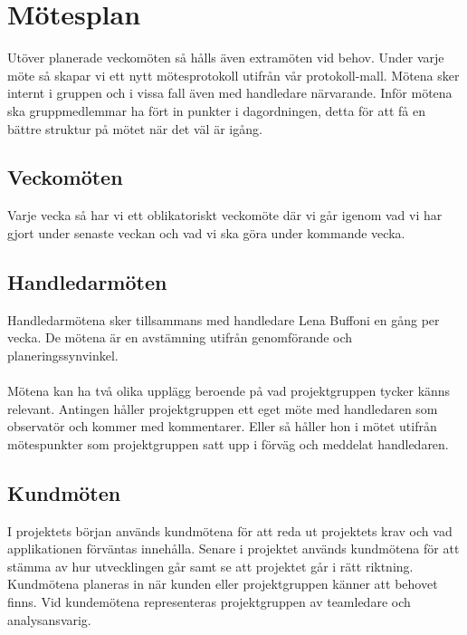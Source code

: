 \section{Mötesplan}
Utöver planerade veckomöten så hålls även extramöten vid behov. Under varje möte så skapar vi ett nytt mötesprotokoll utifrån vår protokoll-mall. Mötena sker internt i gruppen och i vissa fall även med handledare närvarande. Inför mötena ska gruppmedlemmar ha fört in punkter i dagordningen, detta för att få en bättre struktur på mötet när det väl är igång.
\subsection{Veckomöten}
Varje vecka så har vi ett oblikatoriskt veckomöte där vi går igenom vad vi har gjort under senaste veckan och vad vi ska göra under kommande vecka.
\subsection{Handledarmöten}
Handledarmötena sker tillsammans med handledare Lena Buffoni en gång per vecka. De mötena är en avstämning utifrån genomförande och planeringssynvinkel.\\ \\
Mötena kan ha två olika upplägg beroende på vad projektgruppen tycker känns relevant. Antingen håller projektgruppen ett eget möte med handledaren som observatör och kommer med kommentarer. Eller så håller hon i mötet utifrån mötespunkter som projektgruppen satt upp i förväg och meddelat handledaren.
\subsection{Kundmöten}
I projektets början används kundmötena för att reda ut projektets krav och vad applikationen förväntas innehålla. Senare i projektet används kundmötena för att stämma av hur utvecklingen går samt se att projektet går i rätt riktning. Kundmötena planeras in när kunden eller projektgruppen känner att behovet finns. Vid kundemötena representeras projektgruppen av teamledare och analysansvarig.